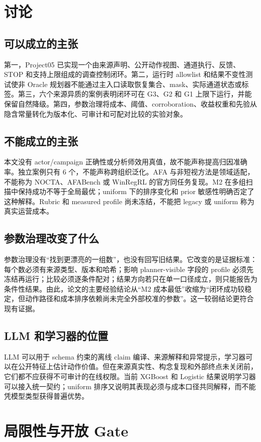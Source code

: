 \documentclass[conference,a4paper,10pt]{IEEEtran}
\begin{document}
\section{讨论}
\subsection{可以成立的主张}
第一，Project05 已实现一个由来源声明、公开动作视图、通道执行、反馈、STOP 和支持上限组成的调查控制闭环。第二，运行时 allowlist 和结果不变性测试使非 Oracle 规划器不能通过主入口读取恢复集合、mask、实际通道状态或标签。第三，六个来源异质的案例表明闭环可在 G3、G2 和 G1 上限下运行，并能保留自然降级。第四，参数治理将成本、阈值、corroboration、收益权重和先验从隐含常量转化为版本化、可审计和可配对比较的实验对象。

\subsection{不能成立的主张}
本文没有 actor/campaign 正确性或分析师效用真值，故不能声称提高归因准确率。独立案例只有 6 个，不能声称跨组织泛化。AFA 与非短视方法是领域适配，不能称为 NOCTA、AFABench 或 WinRegRL 的官方同任务复现。M2 在多组扫描中保持成功不等于全局最优；uniform 下的排序变化和 prior 敏感性明确否定了这种解释。Rubric 和 measured profile 尚未冻结，不能把 legacy 或 uniform 称为真实运营成本。

\subsection{参数治理改变了什么}
参数治理没有“找到更漂亮的一组数”，也没有回写旧结果。它改变的是证据标准：每个数必须有来源类型、版本和哈希；影响 planner-visible 字段的 profile 必须先冻结再运行；比较必须逐条件配对；结果方向若只在单一口径成立，则只能报告为条件性结果。由此，论文的主要经验结论从“M2 成本最低”收缩为“闭环成功较稳定，但动作路径和成本排序依赖尚未完全外部校准的参数”。这一较弱结论更符合现有证据。

\subsection{LLM 和学习器的位置}
LLM 可以用于 schema 约束的离线 claim 编译、来源解释和异常提示，学习器可以在公开特征上估计动作价值。但在来源真实性、构念复现和外部终点未关闭前，它们都不应获得不可审计的在线权限。当前 XGBoost 和 Logistic 结果说明学习器可以接入统一契约；uniform 排序又说明其表现必须与成本口径共同解释，而不能凭模型类型获得普遍优势。

\section{局限性与开放 Gate}
\end{document}
